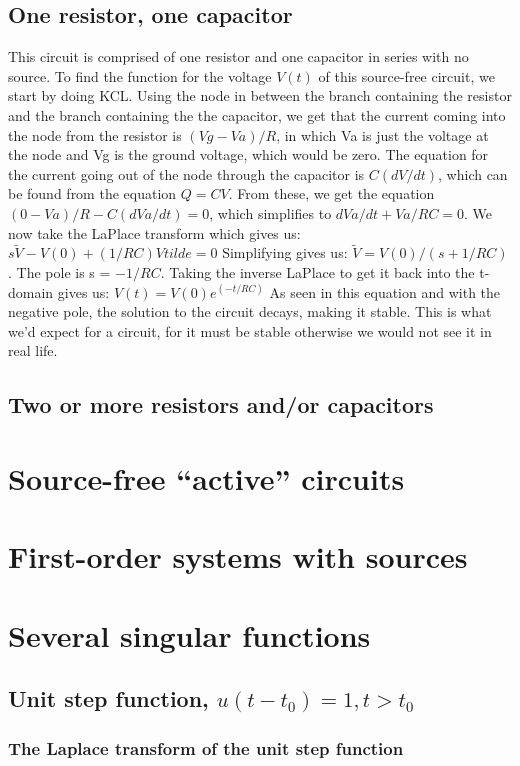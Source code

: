\documentclass[11pt]{book}
\begin{document}
\subsection{One resistor, one capacitor}
This circuit is comprised of one resistor and one capacitor in series with no source.
To find the function for the voltage $V(t)$ of this source-free circuit, we start by doing KCL.
Using the node in between the branch containing the resistor and the branch containing the the capacitor, we get that the current coming into the node from the resistor is $(Vg-Va)/R$, in which Va is just the voltage at the node and Vg is the ground voltage, which would be zero.
The equation for the current going out of the node through the capacitor is $C(dV/dt)$, which can be found from the equation $Q=CV$.
From these, we get the equation $(0-Va)/R - C(dVa/dt) = 0$, which simplifies to $dVa/dt + Va/RC = 0$.
We now take the LaPlace transform which gives us: $s\tilde{V} - V(0) + (1/RC)V{tilde} = 0$
Simplifying gives us: $\tilde{V} = V(0)/(s+1/RC)$. The pole is s = $-1/RC$.
Taking the inverse LaPlace to get it back into the t-domain gives us: $V(t) = V(0)e^(-t/RC)$
As seen in this equation and with the negative pole, the solution to the circuit decays, making it stable.
This is what we'd expect for a circuit, for it must be stable otherwise we would not see it in real life. 


\subsection{Two or more resistors and/or capacitors}
\section{Source-free ``active'' circuits}
\section{First-order systems with sources}
\section{Several singular functions}
\subsection{Unit step function, $u(t-t_0) = 1, t>t_0$}
\subsubsection{The Laplace transform of the unit step function}
\end{document}

